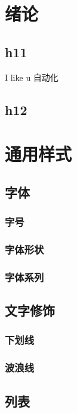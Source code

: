 \section[绪论]{绪论}
\subsection{h11}
I like u
\lipsum[1-10]
自动化
\subsection{h12}

\clearpage
\section{通用样式}
\subsection{字体}
    \subsubsection{字号}
    \subsubsection{字体形状}
    \subsubsection{字体系列}
\subsection{文字修饰}
    \subsubsection{下划线}
    \subsubsection{波浪线}
\subsection{列表}
